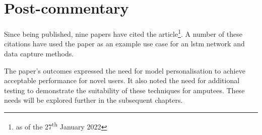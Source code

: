 
\section{Post-commentary}
Since being published, nine papers have cited the article\footnote{as of the 27\textsuperscript{th} January 2022}. A number of these citations have used the paper as an example use case for an \acrshort{lstm} network\cite{Uddin2021, Du2021, Velezguerrero2021, Low2022, Bittibssi2022} and data capture methods\cite{Shin2021, Su2021}.

The paper's outcomes expressed the need for model personalisation to achieve acceptable performance for novel users. It also noted the need for additional testing to demonstrate the suitability of these techniques for amputees. These needs will be explored further in the subsequent chapters.
